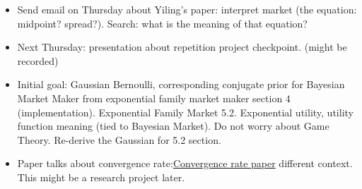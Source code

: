 \documentclass{article}
\begin{document}
\begin{itemize}
	\item Send email on Thursday about Yiling's paper: interpret market (the equation: midpoint? spread?). Search: what is the meaning of that equation?
	\item Next Thursday: presentation about repetition project checkpoint. (might be recorded)
	\item Initial goal: Gaussian Bernoulli, corresponding conjugate prior for Bayesian Market Maker from exponential family market maker section $4$ (implementation). Exponential Family Market 5.2. Exponential utility, utility function meaning (tied to Bayesian Market). Do not worry about Game Theory. Re-derive the Gaussian for 5.2 section.
	\item Paper talks about convergence rate:\href{https://www.cs.colorado.edu/~raf/media/papers/risknets.pdf}{Convergence rate paper} different context. This might be a research project later.
\end{itemize}
\end{document}
